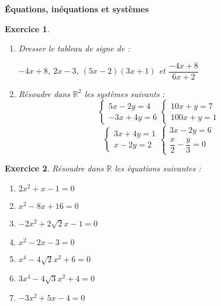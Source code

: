 \documentclass[12pt,a4paper]{article}
\theoremstyle{mystyle}
\newtheorem{exo}{Exercice}
\begin{document}
\pagestyle{fancy}
\fancyhf{} %
\fancyfoot[C]{\thepage} %


\begin{center}
    \textbf{\Large Équations, inéquations et systèmes}
\end{center}
\begin{multicols*}{2}

\begin{exo}
\text{ }
\begin{enumerate}
	\item Dresser le tableau de signe de : 
	
	$-4x + 8$, $2x - 3$, $(5x - 2)(3x + 1)$ et $\dfrac{-4x + 8}{6x + 2}$
	\item Résoudre dans $\mathbb{R}^2$ les systèmes suivants :
	$$\begin{cases} 
5x - 2y = 4 \\ 
-3x + 4y = 6 
\end{cases}
\begin{cases} 
10x + y = 7 \\ 
100x + y = 1 
\end{cases}$$
$$\begin{cases} 
3x + 4y = 1 \\ 
x - 2y = 2 
\end{cases}
\begin{cases} 
3x - 2y = 6 \\ 
\dfrac{x}{2} - \dfrac{y}{3} = 0 
\end{cases}
$$
\end{enumerate}
\end{exo}

\begin{exo}
Résoudre dans \(\mathbb{R}\) les équations suivantes :
\begin{enumerate}
    \item \(2x^{2} + x - 1 = 0\)
    \item \(x^{2} - 8x + 16 = 0\)
    \item \(-2x^{2} + 2\sqrt{2}x - 1 = 0\)
    \item \(x^{2} - 2x - 3 = 0\)
    \item \(x^{4} - 4\sqrt{2}x^{2} + 6 = 0\)
    \item \(3x^{4} - 4\sqrt{3}x^{2} + 4 = 0\)
    \item \(-3x^2 + 5x - 4 = 0\)
\end{enumerate}


\end{exo}
\end{multicols*}
\end{document}
